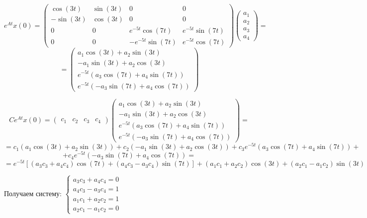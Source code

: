 $$e^{At} x(0)=\left(\begin{array}{cccc}
\cos (3t) & \sin (3t) & 0 & 0\\
-\sin (3t) & \cos (3t) & 0 & 0\\
0 & 0 & e^{-5t} \cos (7t) & e^{-5t} \sin (7t)\\
0 & 0 & -e^{-5t} \sin (7t) & e^{-5t} \cos (7t)
\end{array}\right)\left(\begin{array}{c}
a_1 \\
a_2 \\
a_3 \\
a_4 
\end{array}\right)=
$$
$$=\left(\begin{array}{c}
a_1 \cos (3t)+a_2 \sin (3t)\\
-a_1 \sin (3t)+a_2 \cos (3t)\\
e^{-5t} \left(a_3 \cos (7t)+a_4 \sin (7t)\right)\\
e^{-5t} \left(-a_3 \sin (7t)+a_4 \cos (7t)\right)
\end{array}\right)$$   


$$
Ce^{At} x(0)=\left(\begin{array}{cccc}
c_1  & c_2  & c_3  & c_4 
\end{array}\right)\left(\begin{array}{c}
a_1 \cos (3t)+a_2 \sin (3t)\\
-a_1 \sin (3t)+a_2 \cos (3t)\\
e^{-5t} \left(a_3 \cos (7t)+a_4 \sin (7t)\right)\\
e^{-5t} \left(-a_3 \sin (7t)+a_4 \cos (7t)\right)
\end{array}\right)=
$$
$$
=c_1 (a_1 \cos (3t)+a_2 \sin (3t))+c_2 (-a_1 \sin (3t)+a_2 \cos (3t))+c_3 e^{-5t} (a_3 \cos (7t)+a_4 \sin (7t))+
$$
$$
+c_4 e^{-5t} (-a_3 \sin (7t)+a_4 \cos (7t))=
$$
$$
=e^{-5t} \left\lbrack (a_3 c_3 +a_4 c_4 )\cos (7t)+(a_4 c_3 -a_3 c_4 )\sin (7t)\right\rbrack +(a_1 c_1 +a_2 c_2 )\cos (3t)+(a_2 c_1 -a_1 c_2 )\sin (3t)
$$



Получаем систему: $\left\lbrace \begin{array}{c}
a_3 c_3 +a_4 c_4 =0\\
a_4 c_3 -a_3 c_4 =1\\
a_1 c_1 +a_2 c_2 =1\\
a_2 c_1 -a_1 c_2 =0
\end{array}\right.$



